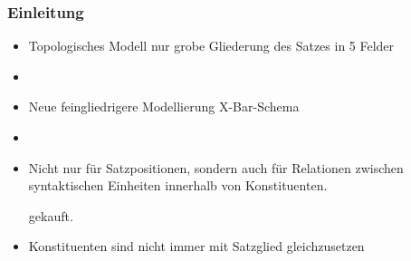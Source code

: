 \begin{frame}
\frametitle{Einleitung}

\begin{itemize}

	\item Topologisches Modell \ras nur grobe Gliederung des Satzes in 5 Felder
	\item[]	
	\item Neue feingliedrigere Modellierung \ras X-Bar-Schema
	\item[]
	\item Nicht nur für Satzpositionen, sondern auch für Relationen zwischen syntaktischen Einheiten innerhalb von Konstituenten.


\eal 
{}
 \label{ex:KonstSatz}
 gekauft.
\zl

	\item Konstituenten sind nicht immer mit Satzglied gleichzusetzen \cf{\ref{ex:KonstSatz}}
	
\end{itemize}

\end{frame}


